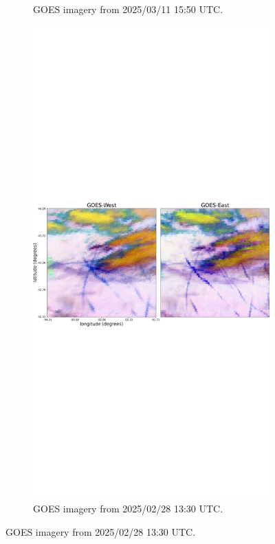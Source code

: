 \begin{figure}
\begin{subfigure}[t]{.49\linewidth}
    \caption{GOES imagery from 2025/03/11 15:50 UTC.}
  \label{best_west}
\end{subfigure}
\hspace{.01cm}
\begin{subfigure}[t]{.49\linewidth}
  \centering
    \includegraphics[width=\textwidth]{figures/east_best.png}
    \caption{GOES imagery from 2025/02/28 13:30 UTC.}
  \label{best_east}
\end{subfigure}


\end{figure}
